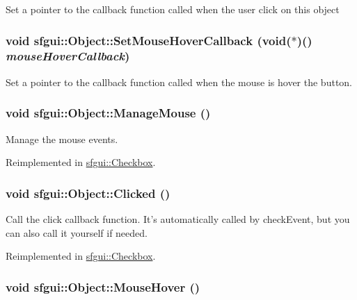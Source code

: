 Set a pointer to the callback function called when the user click on this object \hypertarget{classsfgui_1_1Object_8317dbdf44797dd69de490d4b946ed83}{
\subsubsection[SetMouseHoverCallback]{\setlength{\rightskip}{0pt plus 5cm}void sfgui::Object::SetMouseHoverCallback (void($\ast$)() {\em mouseHoverCallback})}}
\label{classsfgui_1_1Object_8317dbdf44797dd69de490d4b946ed83}




Set a pointer to the callback function called when the mouse is hover the button. \hypertarget{classsfgui_1_1Object_3332575d988f9eee589f57b2ad516593}{
\subsubsection[ManageMouse]{\setlength{\rightskip}{0pt plus 5cm}void sfgui::Object::ManageMouse ()}}
\label{classsfgui_1_1Object_3332575d988f9eee589f57b2ad516593}




Manage the mouse events. 

Reimplemented in \hyperlink{classsfgui_1_1Checkbox_a49cffa3e2bef0e96105cd9a9103e294}{sfgui::Checkbox}.\hypertarget{classsfgui_1_1Object_da7f84701d318ce93fe59cc2f571eaf2}{
\subsubsection[Clicked]{\setlength{\rightskip}{0pt plus 5cm}void sfgui::Object::Clicked ()}}
\label{classsfgui_1_1Object_da7f84701d318ce93fe59cc2f571eaf2}




Call the click callback function. It's automatically called by checkEvent, but you can also call it yourself if needed. 

Reimplemented in \hyperlink{classsfgui_1_1Checkbox_9dc5f05d2f6d960d9fd50c77be3b7d6f}{sfgui::Checkbox}.\hypertarget{classsfgui_1_1Object_68d1941ad05b3d0bdf2ba85702c04cc0}{
\subsubsection[MouseHover]{\setlength{\rightskip}{0pt plus 5cm}void sfgui::Object::MouseHover ()}}
\label{classsfgui_1_1Object_68d1941ad05b3d0bdf2ba85702c04cc0}




